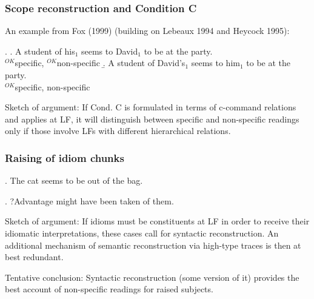 \subsubsection{Scope reconstruction and Condition C}

An  %
example from Fox (1999) (building on Lebeaux 1994 and Heycock 1995):

\ex. \a. A student of his$_{1}$ seems to David$_1$ to be at the party.\\
\null\hfill $^{OK}$specific, $^{OK}$non-specific 
\b. A student of David's$_{1}$ seems to him$_{1}$ to be at the party.\\
\null\hfill $^{OK}$specific, {\small *}non-specific

Sketch of argument: If Cond. C is formulated in terms of c-command relations and applies at LF, it will distinguish between specific and non-specific readings only if those involve LFs with different hierarchical relations.

\enlargethispage{36pt}

\subsubsection{Raising of idiom chunks}

\ex. The cat seems to be out of the bag.

\ex. ?Advantage might have been taken of them.

Sketch of argument: If idioms must be constituents at LF in order to receive their idiomatic interpretations, these cases call for syntactic reconstruction. An additional mechanism of semantic reconstruction via high-type traces is then at best redundant.

\medskip\noindent Tentative conclusion: Syntactic reconstruction (some version of it) provides the best account of non-specific readings for raised subjects.